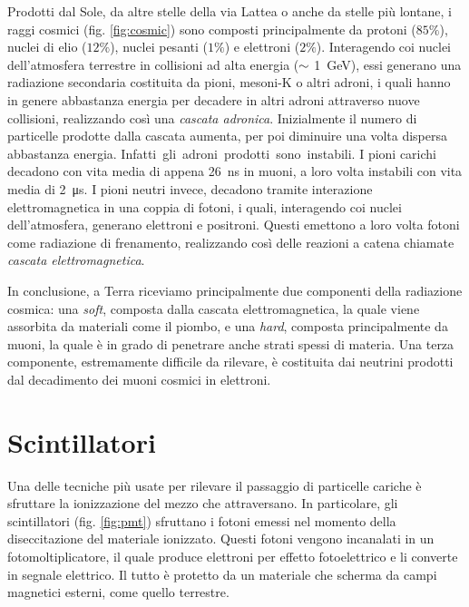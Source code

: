 \documentclass[../main.tex]{subfiles}
\begin{document}
Prodotti dal Sole, da altre stelle della via Lattea o anche da stelle più lontane, i raggi cosmici (fig. \ref{fig:cosmic}) sono composti principalmente da protoni ($85\%$), nuclei di elio ($12\%$), nuclei pesanti ($1\%$) e elettroni ($2\%$). Interagendo coi nuclei dell'atmosfera terrestre in collisioni ad alta energia ($\small \sim$ \SI{1}{\GeV}), essi generano una radiazione secondaria costituita da pioni, mesoni-K o altri adroni, i quali hanno in genere abbastanza energia per decadere in altri adroni attraverso nuove collisioni, realizzando così una \emph{cascata adronica}. Inizialmente il numero di particelle prodotte dalla cascata aumenta, per poi diminuire una volta dispersa abbastanza energia. \mbox{Infatti gli adroni prodotti sono instabili.} I pioni carichi decadono con vita media di appena \SI{26}{\ns} in muoni, a loro volta instabili con vita media di \SI{2}{\micro\s}. I pioni neutri invece, decadono tramite interazione elettromagnetica in una coppia di fotoni, i quali, interagendo coi nuclei dell'atmosfera, generano elettroni e positroni. Questi emettono a loro volta fotoni come radiazione di frenamento, realizzando così delle reazioni a catena chiamate \emph{cascata elettromagnetica}.


In conclusione, a Terra riceviamo principalmente due componenti della radiazione cosmica: una \emph{soft}, composta dalla cascata elettromagnetica, la quale viene assorbita da materiali come il piombo, e una \emph{hard}, composta principalmente da muoni, la quale è in grado di penetrare anche strati spessi di materia. 
Una terza componente, estremamente difficile da rilevare, è costituita dai neutrini prodotti dal decadimento dei muoni cosmici in elettroni.

\section{Scintillatori}
Una delle tecniche più usate per rilevare il passaggio di particelle cariche è sfruttare la ionizzazione del mezzo che attraversano. In particolare, gli scintillatori (fig. \ref{fig:pmt}) sfruttano i fotoni emessi nel momento della diseccitazione del materiale ionizzato. Questi fotoni vengono incanalati in un fotomoltiplicatore, il quale produce elettroni per effetto fotoelettrico e li converte in segnale elettrico. Il tutto è protetto da un materiale che scherma da campi magnetici esterni, come quello terrestre.
\end{document}
